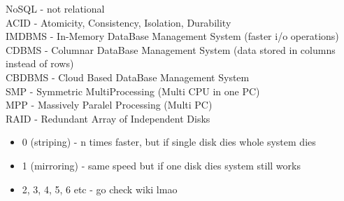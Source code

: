 \documentclass{article}
\begin{document}
    NoSQL  - not relational \\
    ACID   - Atomicity, Consistency, Isolation, Durability \\
    IMDBMS - In-Memory DataBase Management System (faster i/o operations) \\
    CDBMS  - Columnar DataBase Management System (data stored in columns instead of rows) \\
    CBDBMS - Cloud Based DataBase Management System \\
    SMP    - Symmetric MultiProcessing (Multi CPU in one PC) \\
    MPP    - Massively Paralel Processing (Multi PC) \\
    RAID   - Redundant Array of Independent Disks \\
    \begin{itemize}
        \item 0 (striping)  - n times faster, but if single disk dies whole system dies
        \item 1 (mirroring) - same speed but if one disk dies system still works
        \item 2, 3, 4, 5, 6 etc - go check wiki lmao
    \end{itemize}
\end{document}
